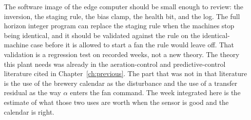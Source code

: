 The software image of the edge computer should be small enough to review: the inversion, the staging rule, the bias clamp, the health bit, and the log. The full horizon integer program can replace the staging rule when the machines stop being identical, and it should be validated against the rule on the identical-machine case before it is allowed to start a fan the rule would leave off. That validation is a regression test on recorded weeks, not a new theory. The theory this plant needs was already in the aeration-control and predictive-control literature cited in Chapter~\ref{ch:previous}. The part that was not in that literature is the use of the brewery calendar as the disturbance and the use of a transfer residual as the way $\alpha$ enters the fan command. The week integrated here is the estimate of what those two uses are worth when the sensor is good and the calendar is right.
